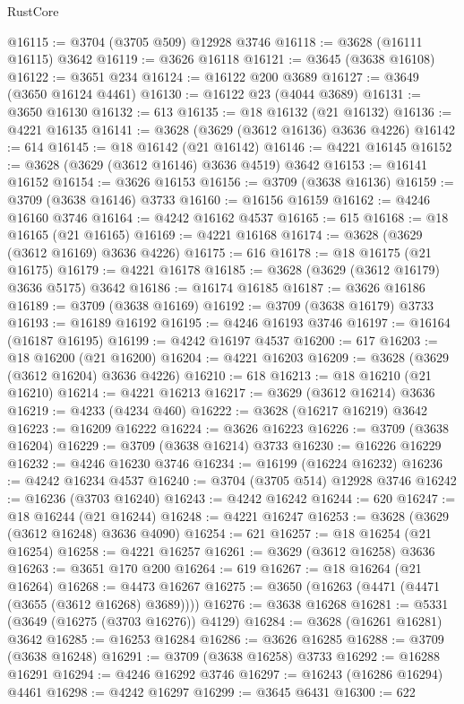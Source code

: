 \begin{lexlean}{RustCore}
\begin{coremodule}
@16115 := @3704 (@3705 @509) @12928 @3746
@16118 := @3628 (@16111 @16115) @3642
@16119 := @3626 @16118
@16121 := @3645 (@3638 @16108)
@16122 := @3651 @234
@16124 := @16122 @200 @3689
@16127 := @3649 (@3650 @16124 @4461)
@16130 := @16122 @23 (@4044 @3689)
@16131 := @3650 @16130
@16132 := 613
@16135 := @18 @16132 (@21 @16132)
@16136 := @4221 @16135
@16141 := @3628 (@3629 (@3612 @16136) @3636 @4226)
@16142 := 614
@16145 := @18 @16142 (@21 @16142)
@16146 := @4221 @16145
@16152 := @3628 (@3629 (@3612 @16146) @3636 @4519) @3642
@16153 := @16141 @16152
@16154 := @3626 @16153
@16156 := @3709 (@3638 @16136)
@16159 := @3709 (@3638 @16146) @3733
@16160 := @16156 @16159
@16162 := @4246 @16160 @3746
@16164 := @4242 @16162 @4537
@16165 := 615
@16168 := @18 @16165 (@21 @16165)
@16169 := @4221 @16168
@16174 := @3628 (@3629 (@3612 @16169) @3636 @4226)
@16175 := 616
@16178 := @18 @16175 (@21 @16175)
@16179 := @4221 @16178
@16185 := @3628 (@3629 (@3612 @16179) @3636 @5175) @3642
@16186 := @16174 @16185
@16187 := @3626 @16186
@16189 := @3709 (@3638 @16169)
@16192 := @3709 (@3638 @16179) @3733
@16193 := @16189 @16192
@16195 := @4246 @16193 @3746
@16197 := @16164 (@16187 @16195)
@16199 := @4242 @16197 @4537
@16200 := 617
@16203 := @18 @16200 (@21 @16200)
@16204 := @4221 @16203
@16209 := @3628 (@3629 (@3612 @16204) @3636 @4226)
@16210 := 618
@16213 := @18 @16210 (@21 @16210)
@16214 := @4221 @16213
@16217 := @3629 (@3612 @16214) @3636
@16219 := @4233 (@4234 @460)
@16222 := @3628 (@16217 @16219) @3642
@16223 := @16209 @16222
@16224 := @3626 @16223
@16226 := @3709 (@3638 @16204)
@16229 := @3709 (@3638 @16214) @3733
@16230 := @16226 @16229
@16232 := @4246 @16230 @3746
@16234 := @16199 (@16224 @16232)
@16236 := @4242 @16234 @4537
@16240 := @3704 (@3705 @514) @12928 @3746
@16242 := @16236 (@3703 @16240)
@16243 := @4242 @16242
@16244 := 620
@16247 := @18 @16244 (@21 @16244)
@16248 := @4221 @16247
@16253 := @3628 (@3629 (@3612 @16248) @3636 @4090)
@16254 := 621
@16257 := @18 @16254 (@21 @16254)
@16258 := @4221 @16257
@16261 := @3629 (@3612 @16258) @3636
@16263 := @3651 @170 @200
@16264 := 619
@16267 := @18 @16264 (@21 @16264)
@16268 := @4473 @16267
@16275 := @3650 (@16263 (@4471 (@4471 (@3655 (@3612 @16268) @3689))))
@16276 := @3638 @16268
@16281 := @5331 (@3649 (@16275 (@3703 @16276)) @4129)
@16284 := @3628 (@16261 @16281) @3642
@16285 := @16253 @16284
@16286 := @3626 @16285
@16288 := @3709 (@3638 @16248)
@16291 := @3709 (@3638 @16258) @3733
@16292 := @16288 @16291
@16294 := @4246 @16292 @3746
@16297 := @16243 (@16286 @16294) @4461
@16298 := @4242 @16297
@16299 := @3645 @6431
@16300 := 622

\end{coremodule}
\end{lexlean}
